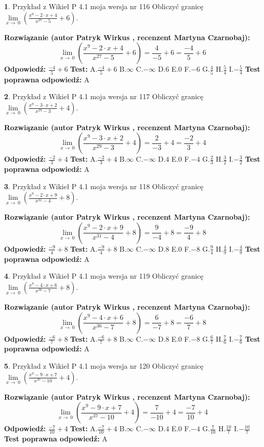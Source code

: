 \documentclass[12pt, a4paper]{article}
\theoremstyle{definition} %
\newtheorem{zad}{}
\newcommand{\zadStart}[1]{\begin{zad}#1\newline}
\newcommand{\zadStop}{\end{zad}}
\newcommand{\rozwStart}[2]{\noindent \textbf{Rozwiązanie (autor #1 , recenzent #2): }\newline}
\newcommand{\rozwStop}{\newline}
\newcommand{\odpStart}{\noindent \textbf{Odpowiedź:}\newline}
\newcommand{\odpStop}{\newline}
\newcommand{\testStart}{\noindent \textbf{Test:}\newline}
\newcommand{\testStop}{\newline}
\newcommand{\kluczStart}{\noindent \textbf{Test poprawna odpowiedź:}\newline}
\newcommand{\kluczStop}{\newline}
\begin{document}
\zadStart{Przykład z Wikieł P 4.1 moja wersja nr 116}
Obliczyć granicę $\lim\limits_{x\to\ 0}(\frac{x^{9}-2 \cdot x +4}{x^{27}-5}+6)$.
\zadStop
\rozwStart{Patryk Wirkus}{Martyna Czarnobaj}
$$\lim\limits_{x\to\ 0}(\frac{x^{9}-2 \cdot x +4}{x^{27}-5}+6)=\frac{4}{-5}+6=\frac{-4}{5}+6$$
\rozwStop
\odpStart
$\frac{-4}{5}+6$
\odpStop
\testStart
A.$\frac{-4}{5}+6$
B.$\infty$
C.$-\infty$
D.$6$
E.$0$
F.$-6$
G.$\frac{4}{5}$
H.$\frac{5}{4}$
I.$-\frac{5}{4}$
\testStop
\kluczStart
A
\kluczStop



\zadStart{Przykład z Wikieł P 4.1 moja wersja nr 117}
Obliczyć granicę $\lim\limits_{x\to\ 0}(\frac{x^{9}-3 \cdot x +2}{x^{29}-3}+4)$.
\zadStop
\rozwStart{Patryk Wirkus}{Martyna Czarnobaj}
$$\lim\limits_{x\to\ 0}(\frac{x^{9}-3 \cdot x +2}{x^{29}-3}+4)=\frac{2}{-3}+4=\frac{-2}{3}+4$$
\rozwStop
\odpStart
$\frac{-2}{3}+4$
\odpStop
\testStart
A.$\frac{-2}{3}+4$
B.$\infty$
C.$-\infty$
D.$4$
E.$0$
F.$-4$
G.$\frac{2}{3}$
H.$\frac{3}{2}$
I.$-\frac{3}{2}$
\testStop
\kluczStart
A
\kluczStop



\zadStart{Przykład z Wikieł P 4.1 moja wersja nr 118}
Obliczyć granicę $\lim\limits_{x\to\ 0}(\frac{x^{9}-2 \cdot x +9}{x^{31}-4}+8)$.
\zadStop
\rozwStart{Patryk Wirkus}{Martyna Czarnobaj}
$$\lim\limits_{x\to\ 0}(\frac{x^{9}-2 \cdot x +9}{x^{31}-4}+8)=\frac{9}{-4}+8=\frac{-9}{4}+8$$
\rozwStop
\odpStart
$\frac{-9}{4}+8$
\odpStop
\testStart
A.$\frac{-9}{4}+8$
B.$\infty$
C.$-\infty$
D.$8$
E.$0$
F.$-8$
G.$\frac{9}{4}$
H.$\frac{4}{9}$
I.$-\frac{4}{9}$
\testStop
\kluczStart
A
\kluczStop



\zadStart{Przykład z Wikieł P 4.1 moja wersja nr 119}
Obliczyć granicę $\lim\limits_{x\to\ 0}(\frac{x^{9}-4 \cdot x +6}{x^{36}-7}+8)$.
\zadStop
\rozwStart{Patryk Wirkus}{Martyna Czarnobaj}
$$\lim\limits_{x\to\ 0}(\frac{x^{9}-4 \cdot x +6}{x^{36}-7}+8)=\frac{6}{-7}+8=\frac{-6}{7}+8$$
\rozwStop
\odpStart
$\frac{-6}{7}+8$
\odpStop
\testStart
A.$\frac{-6}{7}+8$
B.$\infty$
C.$-\infty$
D.$8$
E.$0$
F.$-8$
G.$\frac{6}{7}$
H.$\frac{7}{6}$
I.$-\frac{7}{6}$
\testStop
\kluczStart
A
\kluczStop



\zadStart{Przykład z Wikieł P 4.1 moja wersja nr 120}
Obliczyć granicę $\lim\limits_{x\to\ 0}(\frac{x^{9}-9 \cdot x +7}{x^{37}-10}+4)$.
\zadStop
\rozwStart{Patryk Wirkus}{Martyna Czarnobaj}
$$\lim\limits_{x\to\ 0}(\frac{x^{9}-9 \cdot x +7}{x^{37}-10}+4)=\frac{7}{-10}+4=\frac{-7}{10}+4$$
\rozwStop
\odpStart
$\frac{-7}{10}+4$
\odpStop
\testStart
A.$\frac{-7}{10}+4$
B.$\infty$
C.$-\infty$
D.$4$
E.$0$
F.$-4$
G.$\frac{7}{10}$
H.$\frac{10}{7}$
I.$-\frac{10}{7}$
\testStop
\kluczStart
A
\kluczStop
\end{document}
